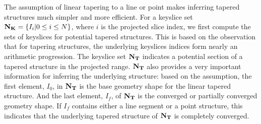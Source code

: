\documentclass[10pt,journal,cspaper,compsoc]{IEEEtran}
\begin{document}
% 
% 
% 
The assumption of linear tapering to a line or point makes inferring
tapered structures much simpler and more efficient. 
For a keyslice set ${\bf N_K} = \{I_i | 0 \le i \le N \}$, 
where $i$ is the projected slice index, we first compute
the sets of keyslices for potential tapered structures.
This is based on the observation that for tapering structures,
the underlying keyslices indices form nearly an arithmetic progression. 
The keyslice set ${\bf N_T}$ indicates a potential section of a
tapered structure in the projected range.
${\bf N_T}$ also provides a very important information for inferring the
underlying structure: based on the assumption, the first element, $I_0$,
in ${\bf N_T}$ is the base geometry shape for the linear tapered structure.
And the last element, $I_f$, of ${\bf N_T}$ 
is the converged or partially converged geometry shape.
If $I_f$ contains either a line segment or a point structure,
this indicates that the underlying tapered structure of ${\bf N_T}$
is completely converged.
\end{document}
